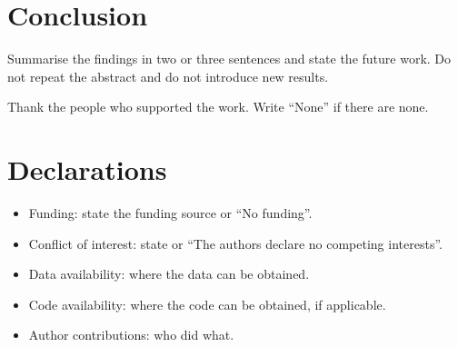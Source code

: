 \documentclass[sn-mathphys-num]{sn-jnl}
\begin{document}
\section{Conclusion}\label{sec5}
Summarise the findings in two or three sentences and state the future work. Do not repeat the abstract and do not introduce new results.

Thank the people who supported the work. Write ``None'' if there are none.

\section*{Declarations}
\begin{itemize}
\item Funding: state the funding source or ``No funding''.
\item Conflict of interest: state or ``The authors declare no competing interests''.
\item Data availability: where the data can be obtained.
\item Code availability: where the code can be obtained, if applicable.
\item Author contributions: who did what.
\end{itemize}


\end{document}

